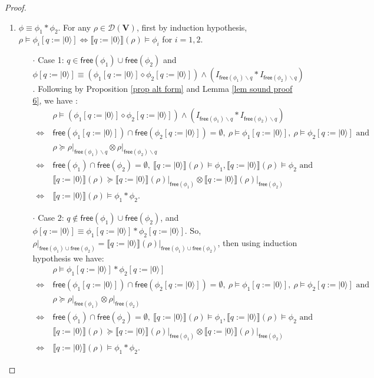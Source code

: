 \documentclass[conference,compsoc, 10pt]{IEEEtran}
\newcommand {\qI} {{q:=|0\rangle}}
\newcommand {\cD } {{\mathcal{D}}}
\newcommand {\id } {{I}}
\newcommand {\free }[1] {{\mathsf{free}\left(#1\right)}}
\newcommand {\rt }[2] {{\left.{#1}\right|_{#2}}}
\newcommand {\vars } {\mathbf{V}}
\newcommand {\sem}[1] {\llbracket#1\rrbracket}
\newcommand{\sd}{\diamond}%
\begin{document}
\begin{appendices}
\begin{proof}
\begin{enumerate}
				\item $\phi \equiv \phi_1\ast\phi_2$. For any $\rho\in\cD(\vars)$, first by induction hypothesis, $\rho\models\phi_i[\qI]\Leftrightarrow\sem{\qI}(\rho)\models\phi_i$ for $i = 1,2$. 
				\begin{itemize}
					\item[$\cdot$]Case 1: $q\in\free{\phi_1}\cup\free{\phi_2}$ and  $\phi[\qI]\equiv (\phi_1[\qI] \sd \phi_2[\qI])\wedge(\id_{\free{\phi_1}\backslash q}\ast\id_{\free{\phi_2}\backslash q})$. Following by Proposition \ref{prop alt form} and Lemma \ref{lem sound proof 6}, we have :				
					\begin{align*}
					&\rho\models(\phi_1[\qI] \sd \phi_2[\qI])\wedge(\id_{\free{\phi_1}\backslash q}\ast\id_{\free{\phi_2}\backslash q}) \\
					\Longleftrightarrow\ &\free{\phi_1[\qI]}\cap\free{\phi_2[\qI]} = \emptyset,\ \rho\models\phi_1[\qI],\ \rho\models\phi_2[\qI] \text{\ and\ }\\
					& \rho\succeq\rt{\rho}{\free{\phi_1}\backslash q}\otimes\rt{\rho}{\free{\phi_2}\backslash q} \\
					\Longleftrightarrow\ &\free{\phi_1}\cap\free{\phi_2} = \emptyset,\ \sem{\qI}(\rho)\models\phi_1, \sem{\qI}(\rho)\models\phi_2 \text{\ and\ }\\
					&\sem{\qI}(\rho)\succeq\rt{\sem{\qI}(\rho)}{\free{\phi_1}}\otimes\rt{\sem{\qI}(\rho)}{\free{\phi_2}} \\
					\Longleftrightarrow\ &\sem{\qI}(\rho)\models\phi_1\ast\phi_2. 
					\end{align*}
					\item[$\cdot$]Case 2: $q\notin\free{\phi_1}\cup\free{\phi_2}$, and $\phi[\qI]\equiv \phi_1[\qI] \ast \phi_2[\qI]$. So, $\rt{\rho}{\free{\phi_1}\cup\free{\phi_2}} = \rt{\sem{\qI}(\rho)}{\free{\phi_1}\cup\free{\phi_2}}$, then using induction hypothesis we have:
					\begin{align*}
					&\rho\models\phi_1[\qI] \ast \phi_2[\qI] \\
					\Longleftrightarrow\ &\free{\phi_1[\qI]}\cap\free{\phi_2[\qI]} = \emptyset,\ \rho\models\phi_1[\qI],\ \rho\models\phi_2[\qI] \text{\ and\ }\\
					& \rho\succeq\rt{\rho}{\free{\phi_1}}\otimes\rt{\rho}{\free{\phi_2}} \\
					\Longleftrightarrow\ &\free{\phi_1}\cap\free{\phi_2} = \emptyset,\ \sem{\qI}(\rho)\models\phi_1, \sem{\qI}(\rho)\models\phi_2 \text{\ and\ }\\
					&\sem{\qI}(\rho)\succeq\rt{\sem{\qI}(\rho)}{\free{\phi_1}}\otimes\rt{\sem{\qI}(\rho)}{\free{\phi_2}} \\
					\Longleftrightarrow\ &\sem{\qI}(\rho)\models\phi_1\ast\phi_2. 
					\end{align*}				
				\end{itemize}
				

\end{enumerate}
\end{proof}
\end{appendices}
\end{document}
